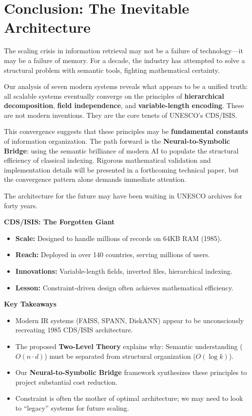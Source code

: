 \documentclass[manuscript,screen,nonacm]{acmart}
\newenvironment{sidebarbox}[1][]{%
  \def\sidebarboxtitle{#1}%
  \begin{oframed}%
  \noindent\textbf{\sidebarboxtitle}\par\smallskip
}{%
  \end{oframed}%
}
\begin{document}
\section{Conclusion: The Inevitable Architecture}

The scaling crisis in information retrieval may not be a failure of technology---it may be a failure of memory. For a decade, the industry has attempted to solve a structural problem with semantic tools, fighting mathematical certainty.

Our analysis of seven modern systems reveals what appears to be a unified truth: all scalable systems eventually converge on the principles of \textbf{hierarchical decomposition}, \textbf{field independence}, and \textbf{variable-length encoding}. These are not modern inventions. They are the core tenets of UNESCO's CDS/ISIS.

This convergence suggests that these principles may be \textbf{fundamental constants} of information organization. The path forward is the \textbf{Neural-to-Symbolic Bridge}: using the semantic brilliance of modern AI to populate the structural efficiency of classical indexing. Rigorous mathematical validation and implementation details will be presented in a forthcoming technical paper, but the convergence pattern alone demands immediate attention.

The architecture for the future may have been waiting in UNESCO archives for forty years.

\begin{sidebarbox}[CDS/ISIS: The Forgotten Giant]
\begin{itemize}
    \item \textbf{Scale:} Designed to handle millions of records on 64KB RAM (1985).
    \item \textbf{Reach:} Deployed in over 140 countries, serving millions of users.
    \item \textbf{Innovations:} Variable-length fields, inverted files, hierarchical indexing.
    \item \textbf{Lesson:} Constraint-driven design often achieves mathematical efficiency.
\end{itemize}
\end{sidebarbox}

\begin{sidebarbox}[Key Takeaways]
\begin{itemize}
    \item Modern IR systems (FAISS, SPANN, DiskANN) appear to be unconsciously recreating 1985 CDS/ISIS architecture.
    \item The proposed \textbf{Two-Level Theory} explains why: Semantic understanding ($O(n \cdot d)$) must be separated from structural organization ($O(\log k)$).
    \item Our \textbf{Neural-to-Symbolic Bridge} framework synthesizes these principles to project substantial cost reduction.
    \item Constraint is often the mother of optimal architecture; we may need to look to ``legacy'' systems for future scaling.
\end{itemize}
\end{sidebarbox}
\end{document}
